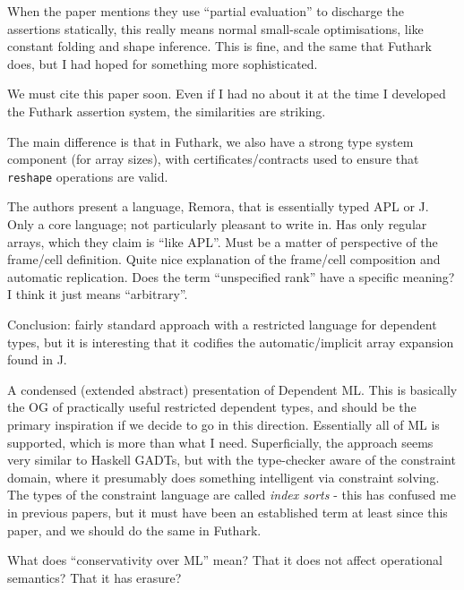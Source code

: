 \documentclass[a4paper, oneside, final]{memoir}
\begin{document}
When the paper mentions they use ``partial evaluation'' to discharge
the assertions statically, this really means normal small-scale
optimisations, like constant folding and shape inference.  This is
fine, and the same that Futhark does, but I had hoped for something
more sophisticated.

We must cite this paper soon.  Even if I had no about it at the time I
developed the Futhark assertion system, the similarities are striking.

The main difference is that in Futhark, we also have a strong type
system component (for array sizes), with certificates/contracts used
to ensure that \texttt{reshape} operations are valid.

\begin{quote}
\end{quote}

The authors present a language, Remora, that is essentially typed APL
or J.  Only a core language; not particularly pleasant to write in.
Has only regular arrays, which they claim is ``like APL''.  Must be a
matter of perspective of the frame/cell definition.  Quite nice
explanation of the frame/cell composition and automatic
replication. Does the term ``unspecified rank'' have a specific
meaning?  I think it just means ``arbitrary''.

Conclusion: fairly standard approach with a restricted language for
dependent types, but it is interesting that it codifies the
automatic/implicit array expansion found in J.

\begin{quote}
\end{quote}

A condensed (extended abstract) presentation of Dependent ML.  This is
basically the OG of practically useful restricted dependent types, and
should be the primary inspiration if we decide to go in this
direction.  Essentially all of ML is supported, which is more than
what I need.  Superficially, the approach seems very similar to
Haskell GADTs, but with the type-checker aware of the constraint
domain, where it presumably does something intelligent via constraint
solving.  The types of the constraint language are called
\textit{index sorts} - this has confused me in previous papers, but it
must have been an established term at least since this paper, and we
should do the same in Futhark.

What does ``conservativity over ML'' mean?  That it does not affect
operational semantics?  That it has erasure?
\end{document}
